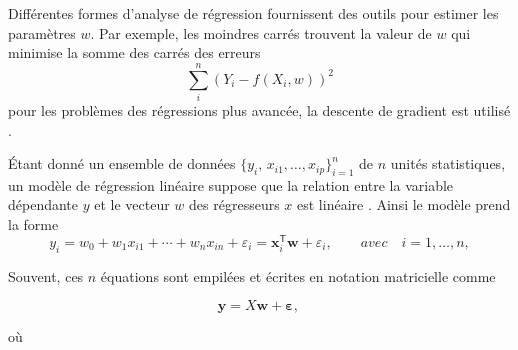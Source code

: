 	Différentes formes d'analyse de régression fournissent des outils pour estimer les paramètres $w$. Par exemple, les moindres carrés trouvent la valeur de $w$ \cite{deepa2021ai} qui minimise la somme des carrés des erreurs $${\sum _{i}^n (Y_{i}-f(X_{i},w ))^{2}}$$ pour les problèmes des régressions plus avancée, la descente de gradient est utilisé \cite{bottou2018optimization}.  
	
	Étant donné un ensemble de données ${\displaystyle \{y_{i},\,x_{i1},\ldots ,x_{ip}\}_{i=1}^{n}}$ de $n$ unités statistiques, un modèle de régression linéaire suppose que la relation entre la variable dépendante $y$ et le vecteur $w$ des régresseurs $x$ est linéaire \cite{antoine2018apprentissage, darlington2016regression}. Ainsi le modèle prend la forme 
	\begin{equation}
		{\displaystyle y_{i}=w _{0}+w _{1}x_{i1}+\cdots +w _{n}x_{in}+\varepsilon _{i}=\mathbf { x} _{i}^{\mathsf {T}}{\boldsymbol {w }}+\varepsilon_{i},\qquad avec \quad i=1,\ldots ,n,}
	\end{equation}

	
	Souvent, ces $n$ équations sont empilées et écrites en notation matricielle comme
	
	\begin{equation}\label{eq:regression_generale}
		{\displaystyle \mathbf {y} =X{\boldsymbol {w}}+{\boldsymbol {\varepsilon}},\,}
	\end{equation}
	

	
	où
	

